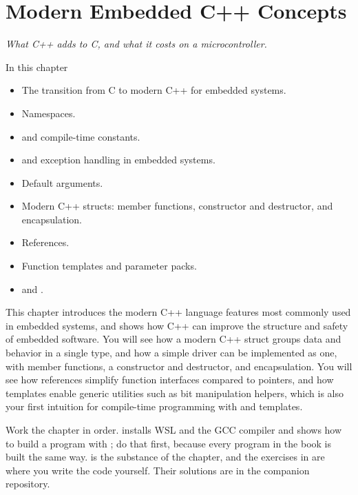 
\chapter{Modern Embedded C++ Concepts}
\label{c1:ch:concepts}

{\large\itshape What C++ adds to C, and what it costs on a microcontroller.\par}

\begin{chapterbox}{In this chapter}
\begin{itemize}
  \item The transition from C to modern C++ for embedded systems.
  \item Namespaces.
  \item {} and compile-time constants.
  \item {} and exception handling in embedded systems.
  \item Default arguments.
  \item Modern C++ structs: member functions, constructor and destructor, and encapsulation.
  \item References.
  \item Function templates and parameter packs.
  \item \code{[[nodiscard]]} and .
\end{itemize}
\end{chapterbox}

This chapter introduces the modern C++ language features most commonly used in embedded systems,
and shows how C++ can improve the structure and safety of embedded software. You will see how a
modern C++ struct groups data and behavior in a single type, and how a simple driver can be
implemented as one, with member functions, a constructor and destructor, and encapsulation. You
will see how references simplify function interfaces compared to pointers, and how templates
enable generic utilities such as bit manipulation helpers, which is also your first intuition for
compile-time programming with  and templates.

Work the chapter in order.  installs WSL and the GCC compiler and shows
how to build a program with ; do that first, because every program in the book is built
the same way.  is the substance of the chapter, and the exercises in
 are where you write the code yourself. Their solutions are in the
companion repository.






